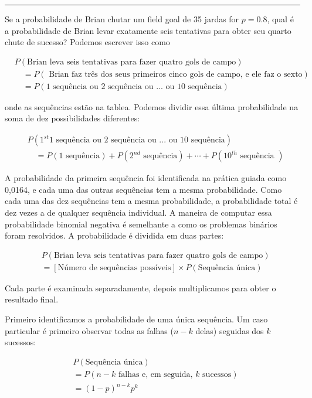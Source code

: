 \documentclass[
]{book}
\theoremstyle{definition}
\theoremstyle{definition}
\theoremstyle{definition}
\theoremstyle{definition}
\theoremstyle{remark}
\begin{document}
\begin{center}\rule{0.5\linewidth}{0.5pt}\end{center}

Se a probabilidade de Brian chutar um field goal de 35 jardas for \(p=0.8\), qual é a probabilidade de Brian levar exatamente seis tentativas para obter seu quarto chute de sucesso? Podemos escrever isso como

\begin{align*}
&P(\text{Brian leva seis tentativas para fazer quatro gols de campo}) \\
& \quad = P(\text{ Brian faz três dos seus primeiros cinco gols de campo, e ele faz o sexto}) \\
& \quad = P(\text{1 sequência ou 2 sequência ou ... ou 10 sequência})
\end{align*}

onde as sequências estão na tablea. Podemos dividir essa última probabilidade na soma de dez possibilidades diferentes:

\begin{align*}
&P(\text{$1^{st}$1 sequência ou 2 sequência ou ... ou 10 sequência}) \\
&\quad = P(\text{1 sequência}) + P(\text{$2^{nd}$ sequência}) + \cdots + P(\text{$10^{th}$ sequência })
\end{align*}

A probabilidade da primeira sequência foi identificada na prática guiada como 0,0164, e cada uma das outras sequências tem a mesma probabilidade. Como cada uma das dez sequências tem a mesma probabilidade, a probabilidade total é dez vezes a de qualquer sequência individual. A maneira de computar essa probabilidade binomial negativa é semelhante a como os problemas binários foram resolvidos. A probabilidade é dividida em duas partes:

\begin{align*}
&P(\text{Brian leva seis tentativas para fazer quatro gols de campo}) \\
&= [\text{Número de sequências possíveis}] \times P(\text{Sequência única})
\end{align*}

Cada parte é examinada separadamente, depois multiplicamos para obter o resultado final.

Primeiro identificamos a probabilidade de uma única sequência. Um caso particular é primeiro observar todas as falhas (\(n-k\) delas) seguidas dos \(k\) sucessos:

\begin{align*}
&P(\text{Sequência única}) \\
&= P(\text{$n-k$ falhas e, em seguida, $k$ sucessos}) \\
&= (1-p)^{n-k} p^{k}
\end{align*}
\end{document}
